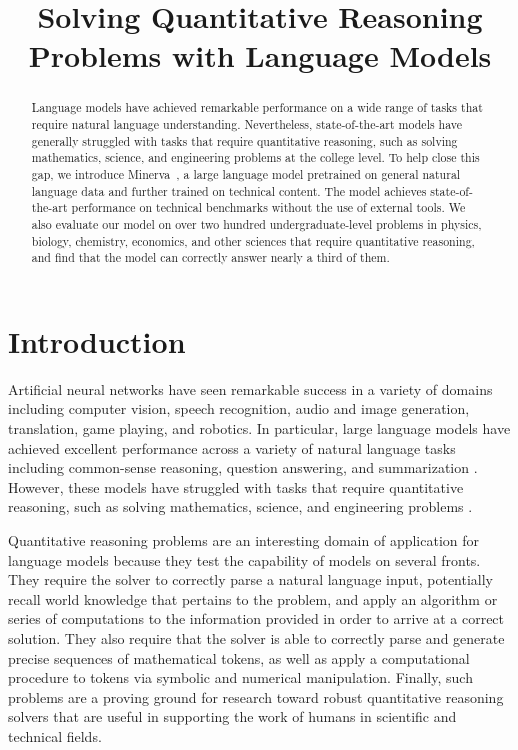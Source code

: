 \title{Solving Quantitative Reasoning Problems with Language Models}

\begin{abstract}
Language models have achieved remarkable performance on a wide range of tasks that require natural language understanding. Nevertheless, state-of-the-art models have generally struggled with tasks that require quantitative reasoning, such as solving mathematics, science, and engineering problems at the college level. To help close this gap, we introduce {Minerva~}\!, a large language model pretrained on general natural language data and further trained on technical content. The model achieves state-of-the-art performance on technical benchmarks without the use of external tools. We also evaluate our model on over two hundred undergraduate-level problems in physics, biology, chemistry, economics, and other sciences that require quantitative reasoning, and find that the model can correctly answer nearly a third of them.
\end{abstract}

\section{Introduction}

\label{sec:introduction}
Artificial neural networks have seen remarkable success in a variety of domains including computer vision, speech recognition, audio and image generation, translation, game playing, and robotics. In particular, large language models have achieved excellent performance across a variety of natural language tasks including common-sense reasoning, question answering, and summarization \citep{raffel2019exploring,gpt3,rae2021scaling,smith2022using,palm}. However, these models have struggled with tasks that require quantitative reasoning, such as solving mathematics, science, and engineering problems \citep{MATH,gsm8k}.

Quantitative reasoning problems are an interesting domain of application for language models because they test the capability of models on several fronts. They require the solver to correctly parse a natural language input, potentially recall world knowledge that pertains to the problem, and apply an algorithm or series of computations to the information provided in order to arrive at a correct solution. They also require that the solver is able to correctly parse and generate precise sequences of mathematical tokens, as well as apply a computational procedure to tokens via symbolic and numerical manipulation. Finally, such problems are a proving ground for research toward robust quantitative reasoning solvers that are useful in supporting the work of humans in scientific and technical fields.

